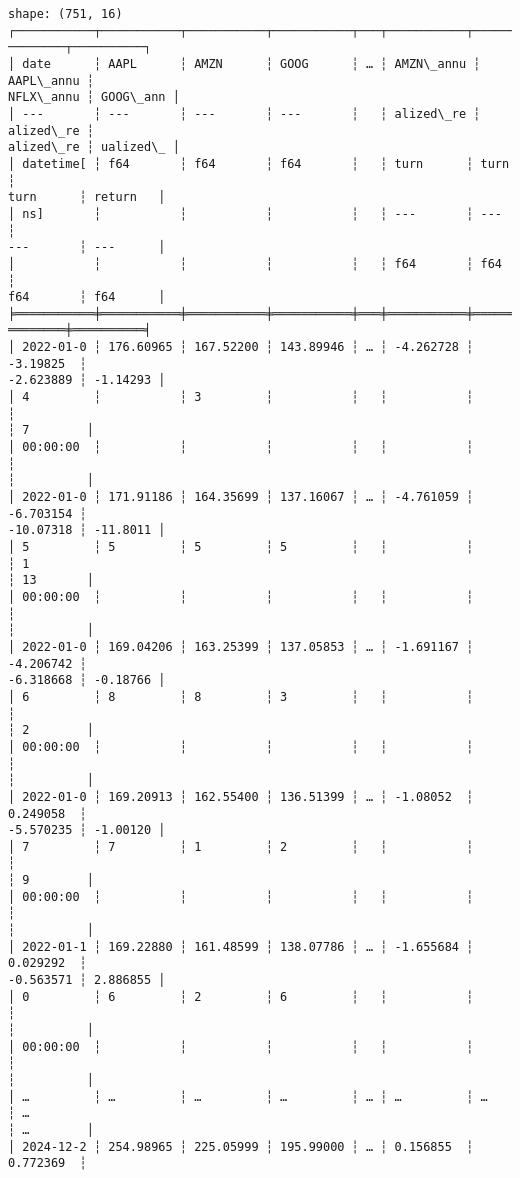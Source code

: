 \documentclass[11pt]{article}
\makeatletter
\newcommand{\boxspacing}{\kern\kvtcb@left@rule\kern\kvtcb@boxsep}
\newcommand{\prompt}[4]{
        {\ttfamily\llap{{\color{#2}[#3]:\hspace{3pt}#4}}\vspace{-\baselineskip}}
    }
\makeatother
\begin{document}
            \begin{tcolorbox}[breakable, size=fbox, boxrule=.5pt, pad at break*=1mm, opacityfill=0]
\prompt{Out}{outcolor}{25}{\boxspacing}
\begin{Verbatim}[commandchars=\\\{\}]
shape: (751, 16)
┌───────────┬───────────┬───────────┬───────────┬───┬───────────┬───────────┬───
────────┬──────────┐
│ date      ┆ AAPL      ┆ AMZN      ┆ GOOG      ┆ … ┆ AMZN\_annu ┆ AAPL\_annu ┆
NFLX\_annu ┆ GOOG\_ann │
│ ---       ┆ ---       ┆ ---       ┆ ---       ┆   ┆ alized\_re ┆ alized\_re ┆
alized\_re ┆ ualized\_ │
│ datetime[ ┆ f64       ┆ f64       ┆ f64       ┆   ┆ turn      ┆ turn      ┆
turn      ┆ return   │
│ ns]       ┆           ┆           ┆           ┆   ┆ ---       ┆ ---       ┆
---       ┆ ---      │
│           ┆           ┆           ┆           ┆   ┆ f64       ┆ f64       ┆
f64       ┆ f64      │
╞═══════════╪═══════════╪═══════════╪═══════════╪═══╪═══════════╪═══════════╪═══
════════╪══════════╡
│ 2022-01-0 ┆ 176.60965 ┆ 167.52200 ┆ 143.89946 ┆ … ┆ -4.262728 ┆ -3.19825  ┆
-2.623889 ┆ -1.14293 │
│ 4         ┆           ┆ 3         ┆           ┆   ┆           ┆           ┆
┆ 7        │
│ 00:00:00  ┆           ┆           ┆           ┆   ┆           ┆           ┆
┆          │
│ 2022-01-0 ┆ 171.91186 ┆ 164.35699 ┆ 137.16067 ┆ … ┆ -4.761059 ┆ -6.703154 ┆
-10.07318 ┆ -11.8011 │
│ 5         ┆ 5         ┆ 5         ┆ 5         ┆   ┆           ┆           ┆ 1
┆ 13       │
│ 00:00:00  ┆           ┆           ┆           ┆   ┆           ┆           ┆
┆          │
│ 2022-01-0 ┆ 169.04206 ┆ 163.25399 ┆ 137.05853 ┆ … ┆ -1.691167 ┆ -4.206742 ┆
-6.318668 ┆ -0.18766 │
│ 6         ┆ 8         ┆ 8         ┆ 3         ┆   ┆           ┆           ┆
┆ 2        │
│ 00:00:00  ┆           ┆           ┆           ┆   ┆           ┆           ┆
┆          │
│ 2022-01-0 ┆ 169.20913 ┆ 162.55400 ┆ 136.51399 ┆ … ┆ -1.08052  ┆ 0.249058  ┆
-5.570235 ┆ -1.00120 │
│ 7         ┆ 7         ┆ 1         ┆ 2         ┆   ┆           ┆           ┆
┆ 9        │
│ 00:00:00  ┆           ┆           ┆           ┆   ┆           ┆           ┆
┆          │
│ 2022-01-1 ┆ 169.22880 ┆ 161.48599 ┆ 138.07786 ┆ … ┆ -1.655684 ┆ 0.029292  ┆
-0.563571 ┆ 2.886855 │
│ 0         ┆ 6         ┆ 2         ┆ 6         ┆   ┆           ┆           ┆
┆          │
│ 00:00:00  ┆           ┆           ┆           ┆   ┆           ┆           ┆
┆          │
│ …         ┆ …         ┆ …         ┆ …         ┆ … ┆ …         ┆ …         ┆ …
┆ …        │
│ 2024-12-2 ┆ 254.98965 ┆ 225.05999 ┆ 195.99000 ┆ … ┆ 0.156855  ┆ 0.772369  ┆

\end{Verbatim}
\end{tcolorbox}
\end{document}
